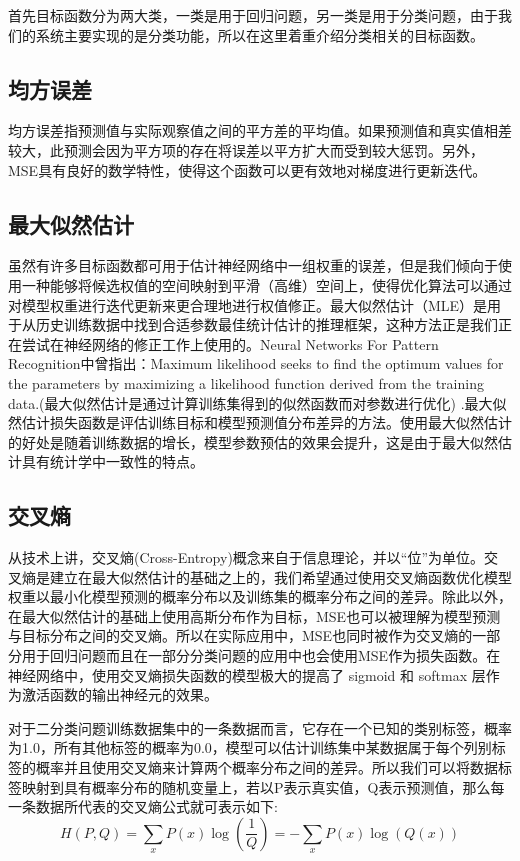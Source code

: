 首先目标函数分为两大类，一类是用于回归问题，另一类是用于分类问题，由于我们的系统主要实现的是分类功能，所以在这里着重介绍分类相关的目标函数。

\subsection{均方误差}

均方误差指预测值与实际观察值之间的平方差的平均值。如果预测值和真实值相差较大，此预测会因为平方项的存在将误差以平方扩大而受到较大惩罚。另外，MSE具有良好的数学特性，使得这个函数可以更有效地对梯度进行更新迭代。

\subsection{最大似然估计}

虽然有许多目标函数都可用于估计神经网络中一组权重的误差，但是我们倾向于使用一种能够将候选权值的空间映射到平滑（高维）空间上，使得优化算法可以通过对模型权重进行迭代更新来更合理地进行权值修正。最大似然估计（MLE）是用于从历史训练数据中找到合适参数最佳统计估计的推理框架，这种方法正是我们正在尝试在神经网络的修正工作上使用的。Neural Networks For Pattern Recognition中曾指出：Maximum likelihood seeks to find the optimum values for the parameters by maximizing a likelihood function derived from the training data.(最大似然估计是通过计算训练集得到的似然函数而对参数进行优化) \cite{NeuralNetworkforPatternRecognize}.最大似然估计损失函数是评估训练目标和模型预测值分布差异的方法。使用最大似然估计的好处是随着训练数据的增长，模型参数预估的效果会提升，这是由于最大似然估计具有统计学中一致性的特点\cite{DeepLearning2016}。

\subsection{交叉熵}

从技术上讲，交叉熵(Cross-Entropy)概念来自于信息理论，并以“位”为单位。交叉熵是建立在最大似然估计的基础之上的，我们希望通过使用交叉熵函数优化模型权重以最小化模型预测的概率分布以及训练集的概率分布之间的差异。除此以外，在最大似然估计的基础上使用高斯分布作为目标，MSE也可以被理解为模型预测与目标分布之间的交叉熵。所以在实际应用中，MSE也同时被作为交叉熵的一部分用于回归问题而且在一部分分类问题的应用中也会使用MSE作为损失函数。在神经网络中，使用交叉熵损失函数的模型极大的提高了 sigmoid 和 softmax 层作为激活函数的输出神经元的效果。

对于二分类问题训练数据集中的一条数据而言，它存在一个已知的类别标签，概率为1.0，所有其他标签的概率为0.0，模型可以估计训练集中某数据属于每个列别标签的概率并且使用交叉熵来计算两个概率分布之间的差异。所以我们可以将数据标签映射到具有概率分布的随机变量上，若以P表示真实值，Q表示预测值，那么每一条数据所代表的交叉熵公式\cite{CrossEntropyFormula}就可表示如下:
\begin{equation}
  H(P, Q) = \sum_{x} P(x)\log(\frac{1}{Q}) = -\sum_{x} P(x)\log(Q(x))
\end{equation}

